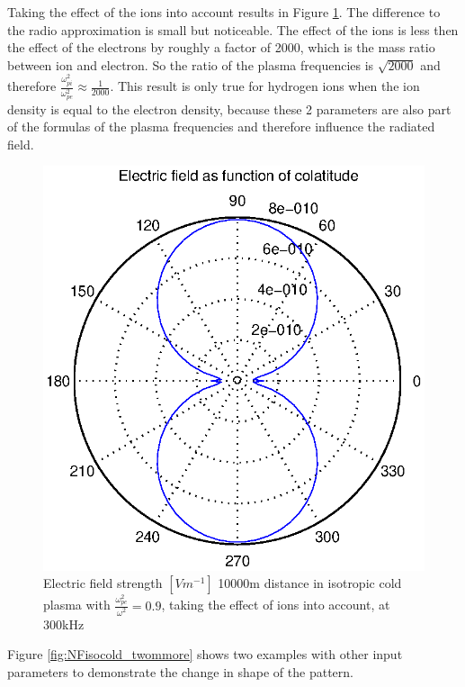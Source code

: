 \documentclass[a4paper,11pt]{thesis}
\begin{document}
Taking the effect of the ions into account results in Figure \ref{figNFisocoldwithions1000m300kHz0.9}. The difference to the radio approximation is small but noticeable. The effect of the ions is less then the effect of the electrons by roughly a factor of 2000, which is the mass ratio between ion and electron. So the ratio of the plasma frequencies is $\sqrt{2000}$ and therefore $\frac{\omega_{pi}^2}{\omega_{pe}^2}\approx \frac{1}{2000}$. This result is only true for hydrogen ions when the ion density is equal to the electron density, because these 2 parameters are also part of the formulas of the plasma frequencies and therefore influence the radiated field.

\begin{figure}
\begin{center}
\includegraphics[width=11.5cm]{DissPics/NFisocoldwithions10000m300kHz0.9.eps}
  \caption{Electric field strength $[Vm^{-1}]$ 10000m distance in isotropic cold plasma with $\frac{\omega_{pe}^2}{\omega^2}=0.9$, taking the effect of ions into account, at 300kHz}\label{figNFisocoldwithions1000m300kHz0.9}
\end{center}
\end{figure}

Figure \ref{fig:NFisocold_twommore} shows two examples with other input parameters to demonstrate the change in shape of the pattern.
\end{document}
